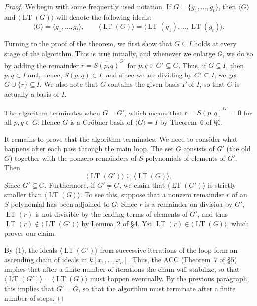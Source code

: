 \begin{proof}
  We begin with some frequently used notation. If $G = \{ g_1, \ldots, g_t \}$, 
  then $\langle G \rangle$ and $\langle \operatorname{LT}(G) \rangle$ will denote the following ideals:
  \[
  \langle G \rangle = \langle g_1, \ldots, g_t \rangle, \qquad
  \langle \operatorname{LT}(G) \rangle = \langle \operatorname{LT}(g_1), \ldots, \operatorname{LT}(g_t) \rangle.
  \]

  Turning to the proof of the theorem, we first show that $G \subseteq I$ holds at every stage of
  the algorithm. This is true initially, and whenever we enlarge $G$, we do so by adding the remainder
  $r = \overline{S(p,q)}^{G'}$ for $p,q \in G' \subseteq G$. Thus, if $G \subseteq I$, then $p,q \in I$ and, 
  hence, $S(p,q) \in I$, and since we are dividing by $G' \subseteq I$, we get $G \cup \{r\} \subseteq I$. 
  We also note that $G$ contains the given basis $F$ of $I$, so that $G$ is actually a basis of $I$.

  The algorithm terminates when $G = G'$, which means that 
  $r = \overline{S(p,q)}^{G'} = 0$ for all $p,q \in G$. Hence $G$ is a Gr\"obner basis of 
  $\langle G \rangle = I$ by Theorem~6 of \S6.

  It remains to prove that the algorithm terminates. We need to consider what happens after each
  pass through the main loop. The set $G$ consists of $G'$ (the old $G$) together with the nonzero
  remainders of $S$-polynomials of elements of $G'$. Then
  \begin{equation}
  \langle \operatorname{LT}(G') \rangle \subseteq \langle \operatorname{LT}(G) \rangle.
  \end{equation}
  Since $G' \subseteq G$. Furthermore, if $G' \ne G$, we claim that 
  $\langle \operatorname{LT}(G') \rangle$ is strictly smaller than $\langle \operatorname{LT}(G) \rangle$. 
  To see this, suppose that a nonzero remainder $r$ of an $S$-polynomial has been adjoined to $G$. 
  Since $r$ is a remainder on division by $G'$, $\operatorname{LT}(r)$ is not divisible by the leading
  terms of elements of $G'$, and thus $\operatorname{LT}(r) \notin \langle \operatorname{LT}(G') \rangle$ 
  by Lemma~2 of \S4. Yet $\operatorname{LT}(r) \in \langle \operatorname{LT}(G) \rangle$, which proves our claim.

  By (1), the ideals $\langle \operatorname{LT}(G') \rangle$ from successive iterations of the loop form an
  ascending chain of ideals in $k[x_1, \ldots, x_n]$. Thus, the ACC (Theorem~7 of \S5) implies that after
  a finite number of iterations the chain will stabilize, so that 
  $\langle \operatorname{LT}(G') \rangle = \langle \operatorname{LT}(G) \rangle$ must happen eventually. 
  By the previous paragraph, this implies that $G' = G$, so that the algorithm must terminate after a 
  finite number of steps.
\end{proof}

